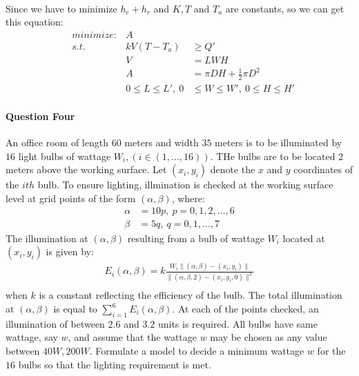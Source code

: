 \documentclass[11pt]{article}
\begin{document}
\paragraph{\color{red}{Answer:}}
Since we have to minimize $h_c + h_r$ and $K, T \text{ and } T_a$ are constants,
so we can get this equation:
\begin{align*}
  &minimize: &A  \\
  &s.t.      &kV(T - T_a) &\geq Q' \\
  &          &V &= LWH \\
  &          &A &= \pi DH + \frac{1}{2}\pi D^2 \\
  &          &0 \leq L \leq L', \ 0 &\leq W \leq W', \ 0 \leq H \leq H'
\end{align*}

\paragraph{Question Four}
  An office room of length $60$ meters and width $35$ meters is to be illuminated
  by $16$ light bulbs of wattage $W_i,(i \in(1,\dots,16))$. THe bulbs are to be
  located $2$ meters above the working surface. Let $(x_i, y_i)$ denote the $x$
  and $y$ coordinates of the $ith$ bulb. To ensure lighting, illmination is
  checked at the working surface level at grid points of the form $ (\alpha, \beta)$,
   where:
  \begin{align*}
    \alpha &= 10p, \ p = 0,1,2,\dots,6\\
    \beta &= 5q, \ q = 0,1,\dots, 7
  \end{align*}
     The illumination at $(\alpha, \beta)$ resulting from a bulb of wattage $W_i$
     located at $(x_i, y_i)$ is given by:
  \begin{align*}
    E_i(\alpha, \beta) = k \frac{W_i \parallel(\alpha,\beta) - (x_i, y_i)\parallel}
    {\parallel(\alpha,\beta,2) - (x_i, y_i,0)\parallel^3} \\
  \end{align*}
  when $k$ is a constant reflecting the efficiency of the bulb. The total illumination
  at $(\alpha, \beta)$ is equal to $\displaystyle \sum^6_{i=1}E_i(\alpha, \beta)$. At each of
  the points checked, an illumination of between $2.6$ and $3.2$ units is required.
  All bulbs have same wattage, say $w$, and assume that the wattage $w$ may be chosen
  as any value between $40W, 200W$. Formulate a model to decide a minimum wattage $w$
  for the $16$ bulbs so that the lighting requirement is met.
\end{document}

